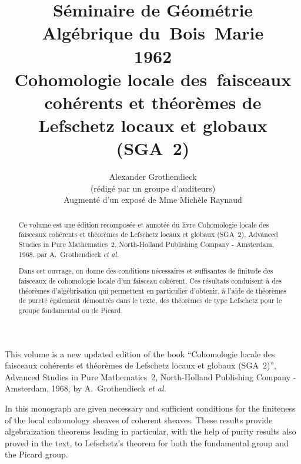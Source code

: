 
\frontmatter

\title[Cohomologie locale des faisceaux coh\'erents (SGA~2)] {S\'eminaire de G\'eom\'etrie Alg\'ebrique du~Bois~Marie \\
1962 \\
Cohomologie locale des~faisceaux coh\'erents et th\'eor\`emes de Lefschetz locaux et globaux \\(SGA~2)}


\author[A.~Grothendieck]{Alexander Grothendieck\\
\smaller\smaller (r\'edig\'e par un groupe d'auditeurs)\\
\larger Augment\'e d'un expos\'e de Mme Mich\`ele Raynaud}

\begin{abstract}
Ce volume est une \'edition recompos\'ee et annot\'ee du livre \og Cohomologie locale des faisceaux coh\'erents et th\'eor\`emes de Lefschetz locaux et globaux (SGA~2)\fg, Advanced Studies in Pure Mathematics~2, North-Holland Publishing Company - Amsterdam, 1968, par A.~Grothendieck \textit{et al.}

Dans cet ouvrage, on donne des conditions n\'ecessaires et suffisantes de finitude des faisceaux de cohomologie locale d'un faisceau coh\'erent. Ces r\'esultats conduisent \`a des th\'eor\`emes d'alg\'ebrisation qui permettent en particulier d'obtenir, \`a l'aide de th\'eor\`emes de puret\'e \'egalement d\'emontr\'es dans le texte, des th\'eor\`emes de type Lefschetz pour le groupe fondamental ou de Picard.
\end{abstract}

\begin{altabstract}
This volume is a new updated edition of the book ``Cohomologie locale des faisceaux coh\'erents et th\'eor\`emes de Lefschetz locaux et globaux (SGA~2)'', Advanced Studies in Pure Mathematics~2, North-Holland Publishing Company - Amsterdam, 1968, by A.~Grothendieck \textit{et al.}

In this monograph are given necessary and sufficient conditions for the finiteness of the local cohomology sheaves of coherent sheaves. These results provide algebraization theorems leading in particular, with the help of purity results also proved in the text, to Lefschetz's theorem for both the fundamental group and the Picard group.
\end{altabstract}

